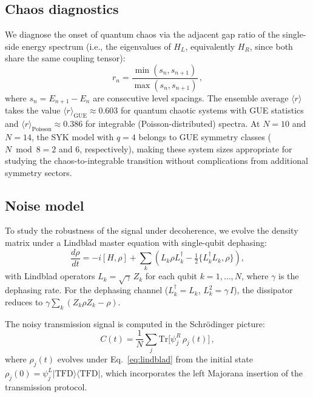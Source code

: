 \documentclass[aps,prd,twocolumn,superscriptaddress,nofootinbib,floatfix]{revtex4-2}
\newcommand{\avg}[1]{\langle #1 \rangle}
\newcommand{\tfd}{\mathrm{TFD}}
\newcommand{\tr}{\mathrm{Tr}}
\begin{document}
\subsection{Chaos diagnostics}
\label{sec:chaos}

We diagnose the onset of quantum chaos via the adjacent gap ratio of the
single-side energy spectrum (i.e., the eigenvalues of $H_L$, equivalently
$H_R$, since both share the same coupling tensor):
\begin{equation}
  r_n = \frac{\min(s_n, s_{n+1})}{\max(s_n, s_{n+1})}\,,
  \label{eq:gap_ratio}
\end{equation}
where $s_n = E_{n+1} - E_n$ are consecutive level spacings. The ensemble
average $\avg{r}$ takes the value $\avg{r}_\mathrm{GUE} \approx 0.603$ for
quantum chaotic systems with GUE statistics and
$\avg{r}_\mathrm{Poisson} \approx 0.386$ for integrable (Poisson-distributed)
spectra. At $N=10$ and $N=14$, the SYK model with $q=4$ belongs to GUE
symmetry classes ($N \bmod 8 = 2$ and $6$, respectively), making these
system sizes appropriate for studying the chaos-to-integrable transition
without complications from additional symmetry sectors.

\subsection{Noise model}
\label{sec:noise}

To study the robustness of the signal under decoherence, we evolve the
density matrix under a Lindblad master equation with single-qubit
dephasing:
\begin{equation}
  \frac{d\rho}{dt} = -i[H,\rho] + \sum_k
    \left(L_k \rho L_k^\dagger
    - \tfrac{1}{2}\{L_k^\dagger L_k, \rho\}\right),
  \label{eq:lindblad}
\end{equation}
with Lindblad operators $L_k = \sqrt{\gamma}\, Z_k$ for each qubit
$k = 1, \ldots, N$, where $\gamma$ is the dephasing rate. For the
dephasing channel ($L_k^\dagger = L_k$, $L_k^2 = \gamma\, I$), the
dissipator reduces to $\gamma\sum_k (Z_k \rho Z_k - \rho)$.

The noisy transmission signal is computed in the Schr\"odinger picture:
\begin{equation}
  C(t) = \frac{1}{N}\sum_j \tr\bigl[\psi_j^R\,\rho_j(t)\bigr]\,,
\end{equation}
where $\rho_j(t)$ evolves under Eq.~\eqref{eq:lindblad} from the initial
state $\rho_j(0) = \psi_j^L |\tfd\rangle\langle\tfd|$, which incorporates
the left Majorana insertion of the transmission protocol.
\end{document}
